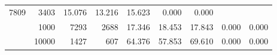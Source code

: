 \begin{table}
\begin{tabular}{rrrrrrrrr}
							     7809  & 3403  
	                           & 15.076 & 13.216 & 15.623
	                           & 0.000 & 0.000  \\
	                
	            
					 &  
					 
					\multirow{ 1 }{*}{ 1000 } &
					
						
							    
							     7293  & 2688  
	                           & 17.346 & 18.453 & 17.843
	                           & 0.000 & 0.000  \\
	                
	            
					 &  
					 
					\multirow{ 1 }{*}{ 10000 } &
					
						
							    
							     1427  & 607  
	                           & 64.376 & 57.853 & 69.610
	                           & 0.000 & 0.000  \\
	                
	            
	        

\hline

\end{tabular}
\end{table}
\clearpage


	    

